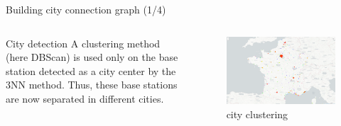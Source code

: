 \begin{frame}{Building city connection graph (1/4)}
    \begin{columns}
        \begin{column}{0.4\textwidth}
            \begin{block}{City detection}
                A clustering method (here DBScan) is used only on the base station detected as a city center by the 3NN method.
                Thus, these base stations are now separated in different cities.
            \end{block}
        \end{column}
        \begin{column}{0.6\textwidth}
            \begin{figure}
                \includegraphics[width=0.5\paperwidth]{images/road_detection/city_clustering.png}
                \caption{city clustering}
            \end{figure}
        \end{column}
    \end{columns}        
\end{frame}

